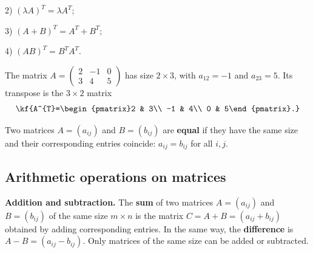 2) $(\lambda A)^{T}=\lambda A^{T}$;

3) $(A+B)^{T}=A^{T}+B^{T}$;

4) $(AB)^{T}=B^{T}A^{T}$.

\vspace{3pt}
\begin{misol}
The matrix $A=\begin{pmatrix}2 & -1 & 0\\ 3 & 4 & 5\end{pmatrix}$ has size
$2\times 3$, with $a_{12}=-1$ and $a_{23}=5$. Its transpose is the $3\times 2$ matrix
\[\kf{A^{T}=\begin{pmatrix}2 & 3\\ -1 & 4\\ 0 & 5\end{pmatrix}.}\]
\end{misol}
Two matrices $A=(a_{ij})$ and $B=(b_{ij})$ are \textbf{equal} if they have the same
size and their corresponding entries coincide: $a_{ij}=b_{ij}$ for all $i,j$.
\bigskip
\subsection{Arithmetic operations on matrices}
\textbf{Addition and subtraction.}
The \textbf{sum} of two matrices $A=(a_{ij})$ and $B=(b_{ij})$ of the same size
$m\times n$ is the matrix $C=A+B=(a_{ij}+b_{ij})$ obtained by adding corresponding
entries. In the same way, the \textbf{difference} is $A-B=(a_{ij}-b_{ij})$.
Only matrices of the same size can be added or subtracted.

